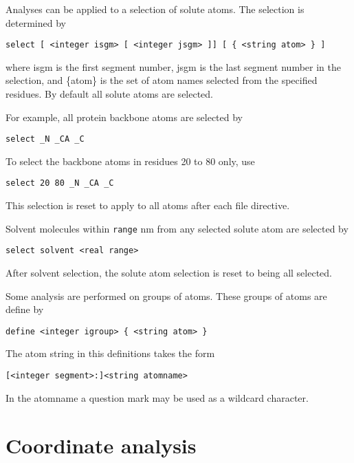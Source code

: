 Analyses can be applied to a selection of solute atoms. The selection
is determined by

\begin{verbatim}
select [ <integer isgm> [ <integer jsgm> ]] [ { <string atom> } ]
\end{verbatim}

where {\rm isgm} is the first segment number, {\rm jsgm} is the last 
segment number in the selection, and {\rm \{atom\}} is the set of atom
names selected from the specified residues. By default all solute
atoms are selected.
\par
For example, all protein backbone atoms are selected by

\begin{verbatim}
select _N _CA _C
\end{verbatim}

To select the backbone atoms in residues 20 to 80 only, use

\begin{verbatim}
select 20 80 _N _CA _C
\end{verbatim}

This selection is reset to apply to all atoms after each file
directive.

Solvent molecules within \verb+range+ nm from any selected solute atom
are selected by

\begin{verbatim}
select solvent <real range>
\end{verbatim}

After solvent selection, the solute atom selection is reset to being all
selected.

\par

Some analysis are performed on groups of atoms. These groups of atoms
are define by

\begin{verbatim}
define <integer igroup> { <string atom> }
\end{verbatim}

The atom string in this definitions takes the form

\begin{verbatim}
[<integer segment>:]<string atomname>
\end{verbatim}

In the atomname a question mark may be used as a wildcard character.

\section{Coordinate analysis}

